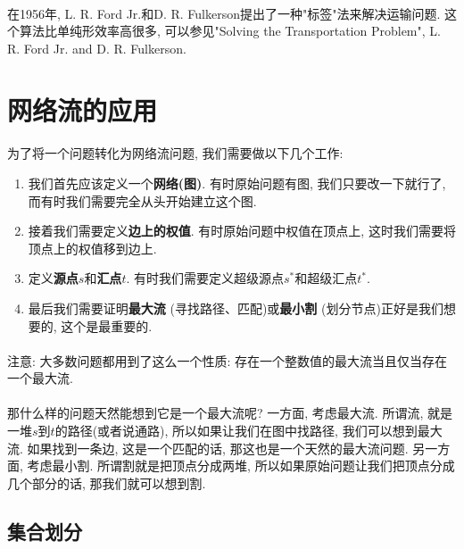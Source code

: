 \documentclass[a4paper]{article}
\begin{document}
\paragraph{}在1956年, L. R. Ford Jr.和D. R. Fulkerson提出了一种"标签"法来解决运输问题. 这个算法比单纯形效率高很多, 可以参见"Solving the Transportation Problem", L. R. Ford Jr. and D. R. Fulkerson.



\section{网络流的应用}
        \paragraph{} 为了将一个问题转化为网络流问题, 我们需要做以下几个工作:
        \begin{enumerate}
         \item 我们首先应该定义一个{\bf 网络(图)}. 有时原始问题有图, 我们只要改一下就行了, 而有时我们需要完全从头开始建立这个图.
         \item 接着我们需要定义{\bf 边上的权值}. 有时原始问题中权值在顶点上, 这时我们需要将顶点上的权值移到边上.
         \item 定义{\bf 源点$s$}和{\bf 汇点$t$}. 有时我们需要定义超级源点$s^*$和超级汇点$t^*$.
         \item 最后我们需要证明{\bf 最大流} (寻找路径、匹配)或{\bf 最小割} (划分节点)正好是我们想要的, 这个是最重要的.
        \end{enumerate}
        \paragraph{}注意: 大多数问题都用到了这么一个性质: 存在一个整数值的最大流当且仅当存在一个最大流.
        \paragraph{}那什么样的问题天然能想到它是一个最大流呢? 一方面, 考虑最大流. 所谓流, 就是一堆$s$到$t$的路径(或者说通路), 所以如果让我们在图中找路径, 我们可以想到最大流. 如果找到一条边, 这是一个匹配的话, 那这也是一个天然的最大流问题. 另一方面, 考虑最小割. 所谓割就是把顶点分成两堆, 所以如果原始问题让我们把顶点分成几个部分的话, 那我们就可以想到割.
        
    \subsection{集合划分}
\end{document}
